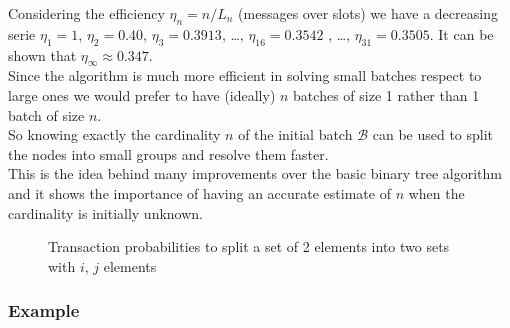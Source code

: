 \documentclass[12pt,a4paper]{report}
\begin{document}
Considering the efficiency $\eta_{n}=n/L_{n}$ (messages over slots) we have a decreasing serie $\eta_{1}=1$, $\eta_{2}=0.40$, $\eta_{3}=0.3913$, \dots, $\eta_{16}=0.3542$ , \dots, $\eta_{31}=0.3505$. It can be shown \cite{capetanakis} that $\eta_{\infty} \approx 0.347$.\\

Since the algorithm is much more efficient in solving small batches respect to large ones we would prefer to have (ideally)  $n$ batches of size 1 rather than 1 batch of size $n$.\\
So knowing exactly the cardinality $n$ of the initial batch $\mathcal{B}$ can be used to split the nodes into small groups and resolve them faster. \\This is the idea behind many improvements over the basic binary tree algorithm and it shows the importance of having an accurate estimate of $n$ when the cardinality is initially unknown.

\begin{figure}
\centering
{}
\caption[\emph{BT}: Batch split probabilities]{Transaction probabilities to split a set of 2 elements into two sets with $i$, $j$ elements}
\end{figure}

\subsubsection{Example}
\end{document}
